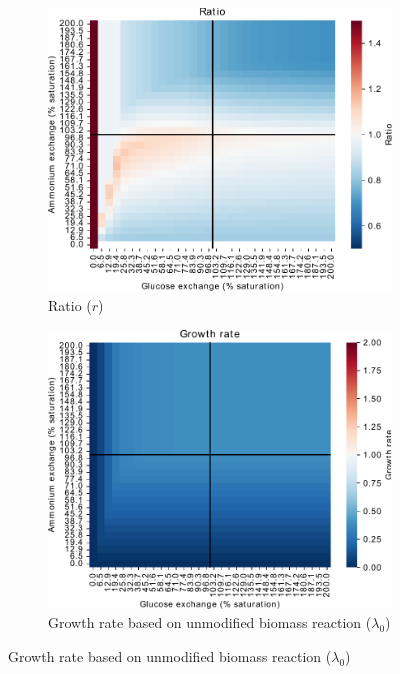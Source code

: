 \begin{figure}
  \centering
  \begin{subfigure}[t]{0.45\textwidth}
  \centering
    \includegraphics[width=\linewidth]{ec_grid_glc_amm_ratio}
    \caption{
      Ratio ($r$)
    }
    \label{fig:model-grid-glc-ratio}
  \end{subfigure}%
  \begin{subfigure}[t]{0.45\textwidth}
  \centering
    \includegraphics[width=\linewidth]{ec_grid_glc_amm_growthrate}
    \caption{
      Growth rate based on unmodified biomass reaction ($\lambda_{0}$)
}
\end{subfigure}
\end{figure}
